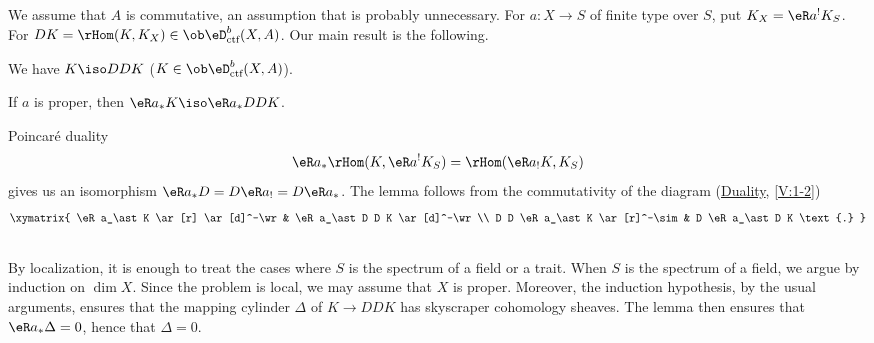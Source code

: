 \subsection{}\label{VII:4-2}

We assume that $A$ is commutative, an assumption that is probably
unnecessary. For $a:X\to S$ of finite type over $S$, put
$K_X=\eR a^! K_S$. For 
$D K=\rHom(K,K_X)\in\ob\eD_\text{ctf}^b(X,A)$. Our main result is the
following.





\begin{theorem_}\label{VII:4-3}
We have $K\iso D D K$ ($K\in \ob\eD_\textnormal{ctf}^b(X,A)$).
\end{theorem_}





\begin{lemma_}\label{VII:4-4}
If $a$ is proper, then $\eR a_\ast K \iso \eR a_\ast D D K$.
\end{lemma_}

Poincaré duality
\[
  \eR a_\ast \rHom(K,\eR a^! K_S) = \rHom(\eR a_! K,K_S) 
\]
gives us an isomorphism $\eR a_\ast D = D \eR a_! = D \eR a_\ast$. The lemma
follows from the commutativity of the diagram (\hyperref[V]{Duality},
\ref{V:1-2})
\[\xymatrix{
  \eR a_\ast K \ar[r] \ar[d]^-\wr 
    & \eR a_\ast D D K \ar[d]^-\wr \\
  D D \eR a_\ast K \ar[r]^-\sim 
    & D \eR a_\ast D K \text{.} 
}\]





\subsection{}\label{VII:4-5}

By localization, it is enough to treat the cases where $S$ is the spectrum
of a field or a trait. When $S$ is the spectrum of a field, we argue by
induction on $\dim X$. Since the problem is local, we may assume that $X$ is
proper. Moreover, the induction hypothesis, by the usual arguments, ensures
that the mapping cylinder $\Delta$ of $K\to D D K$ has skyscraper cohomology
sheaves. The lemma then ensures that $\eR a_\ast \Delta=0$, hence that
$\Delta=0$.





\subsection{}\label{VII:4-6}

